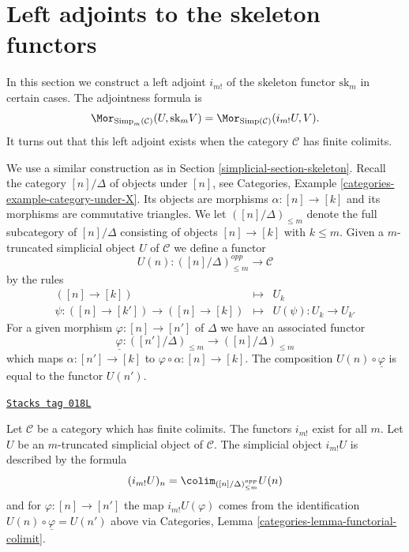 \section{Left adjoints to the skeleton functors}
\label{simplicial-section-adjoint-left}
In this section we construct a left adjoint $i_{m!}$
of the skeleton functor $\text{sk}_m$ in certain cases.
The adjointness formula is
$$
\Mor_{\text{Simp}_m(\mathcal{C})}(U, \text{sk}_mV)
=
\Mor_{\text{Simp}(\mathcal{C})}(i_{m!}U, V).
$$
It turns out that this left adjoint exists when
the category $\mathcal{C}$ has finite colimits.

\medskip\noindent
We use a similar construction as in Section \ref{simplicial-section-skeleton}.
Recall the category $[n]/\Delta$ of objects
under $[n]$, see
Categories, Example \ref{categories-example-category-under-X}.
Its objects are morphisms $\alpha : [n] \to [k]$
and its morphisms are commutative triangles.
We let $([n]/\Delta)_{\leq m}$ denote the full subcategory
of $[n]/\Delta$ consisting of objects $[n] \to [k]$
with $k \leq m$. Given a $m$-truncated
simplicial object $U$ of $\mathcal{C}$
we define a functor
$$
U(n) : ([n]/\Delta)_{\leq m}^{opp} \longrightarrow \mathcal{C}
$$
by the rules
\begin{eqnarray*}
([n] \to [k]) & \longmapsto & U_k \\
\psi : ([n] \to [k']) \to ([n] \to [k])
& \longmapsto &
U(\psi) : U_k \to U_{k'}
\end{eqnarray*}
For a given morphism $\varphi : [n] \to [n']$ of $\Delta$
we have an associated functor
$$
\underline{\varphi} :
([n']/\Delta)_{\leq m}
\longrightarrow
([n]/\Delta)_{\leq m}
$$
which maps $\alpha : [n'] \to [k]$ to
$\varphi \circ \alpha : [n] \to [k]$.
The composition $U(n) \circ \underline{\varphi}$ is
equal to the functor $U(n')$.

\begin{lemma}
\label{simplicial-lemma-left-adjoint-exists}
\href{https://stacks.math.columbia.edu/tag/018L}{\texttt{Stacks tag 018L}}

Let $\mathcal{C}$ be a category which has finite colimits.
The functors $i_{m!}$ exist for all $m$.
Let $U$ be an $m$-truncated simplicial object of $\mathcal{C}$.
The simplicial object $i_{m!}U$
is described by the formula
$$
(i_{m!}U)_n = \colim_{([n]/\Delta)_{\leq m}^{opp}} U(n)
$$
and for $\varphi : [n] \to [n']$ the map
$i_{m!}U(\varphi)$ comes from the
identification $U(n) \circ \underline{\varphi} = U(n')$ above
via Categories, Lemma \ref{categories-lemma-functorial-colimit}.
\end{lemma}


